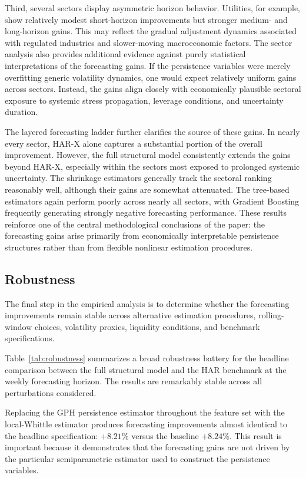 \documentclass[unnumsec,webpdf,contemporary,large]{oup-authoring-template}%
\theoremstyle{thmstyleone}%
\theoremstyle{thmstyletwo}%
\theoremstyle{thmstylethree}%
\begin{document}
Third, several sectors display asymmetric horizon behavior. Utilities, for
example, show relatively modest short-horizon improvements but stronger
medium- and long-horizon gains. This may reflect the gradual adjustment
dynamics associated with regulated industries and slower-moving
macroeconomic factors.
The sector analysis also provides additional evidence against purely
statistical interpretations of the forecasting gains. If the persistence
variables were merely overfitting generic volatility dynamics, one would
expect relatively uniform gains across sectors. Instead, the gains align
closely with economically plausible sectoral exposure to systemic stress
propagation, leverage conditions, and uncertainty duration.

The layered forecasting ladder further clarifies the source of these gains.
In nearly every sector, HAR-X alone captures a substantial portion of the
overall improvement. However, the full structural model consistently extends
the gains beyond HAR-X, especially within the sectors most exposed to
prolonged systemic uncertainty. The shrinkage estimators generally track
the sectoral ranking reasonably well, although their gains are somewhat
attenuated. The tree-based estimators again perform poorly across nearly
all sectors, with Gradient Boosting frequently generating strongly negative
forecasting performance. These results reinforce one of the central
methodological conclusions of the paper: the forecasting gains arise
primarily from economically interpretable persistence structures rather than
from flexible nonlinear estimation procedures.





\subsection{Robustness}

The final step in the empirical analysis is to determine whether the
forecasting improvements remain stable across alternative estimation
procedures, rolling-window choices, volatility proxies, liquidity
conditions, and benchmark specifications.

Table~\ref{tab:robustness} summarizes a broad robustness battery for the
headline comparison between the full structural model and the HAR benchmark
at the weekly forecasting horizon. The results are remarkably stable across
all perturbations considered.

Replacing the GPH persistence estimator throughout the feature set with
the local-Whittle estimator produces forecasting improvements almost
identical to the headline specification: $+8.21\%$ versus the baseline
$+8.24\%$. This result is important because it demonstrates that the
forecasting gains are not driven by the particular semiparametric estimator
used to construct the persistence variables.
\end{document}
